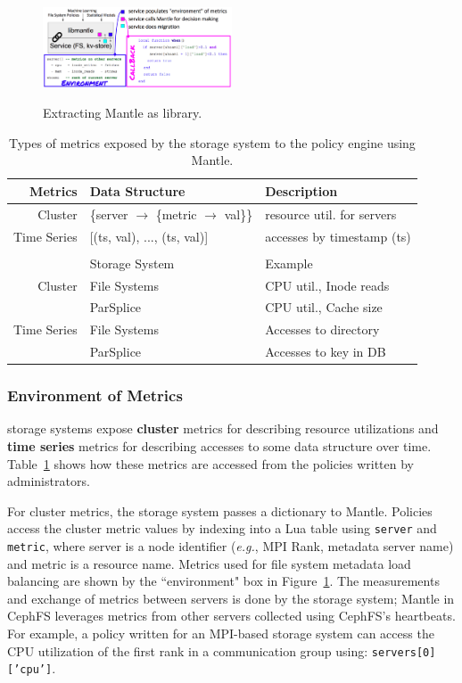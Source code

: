 \begin{figure}[t]
  \noindent\includegraphics[width=0.5\textwidth]{figures/mantle.png}\\

  \caption{Extracting Mantle as library.\label{fig:mantle}}

\end{figure}

\begin{table}
  \centering
  \begin{tabular}{ r | l | l }
  Metrics     & Data Structure & Description \\\hline
  Cluster     & \{server \(\rightarrow\) \{metric \(\rightarrow\) val\}\}
              & resource util. for servers \\
  Time Series & [(ts, val), ..., (ts, val)]
              & accesses by timestamp (ts) \\
  && \\
              & Storage System & Example \\\hline
  Cluster     & File Systems & CPU util., Inode reads \\
              & ParSplice    & CPU util., Cache size \\
  Time Series & File Systems & Accesses to directory \\
              & ParSplice    & Accesses to key in DB\\
  \end{tabular}
  \caption{Types of metrics exposed by the storage system to the policy engine using Mantle.\label{table:metrics}}
\end{table}

\subsubsection{Environment of Metrics} storage systems expose \textbf{cluster} metrics
for describing resource utilizations and \textbf{time series} metrics for
describing accesses to some data structure over time. Table~\ref{table:metrics}
shows how these metrics are accessed from the policies written by
administrators. 

For cluster metrics, the storage system passes a dictionary to Mantle. Policies access
the cluster metric values by indexing into a Lua table using \texttt{server}
and \texttt{metric}, where server is a node identifier ({\it e.g.}, MPI Rank,
metadata server name) and metric is a resource name.  Metrics used for file
system metadata load balancing are shown by the ``environment" box in
Figure~\ref{fig:mantle}. The measurements and exchange of metrics between
servers is done by the storage system; Mantle in CephFS leverages metrics from other
servers collected using CephFS's heartbeats.  For example, a policy written for
an MPI-based storage system can access the CPU utilization of the first rank in a
communication group using: \texttt{servers[0]['cpu']}.

